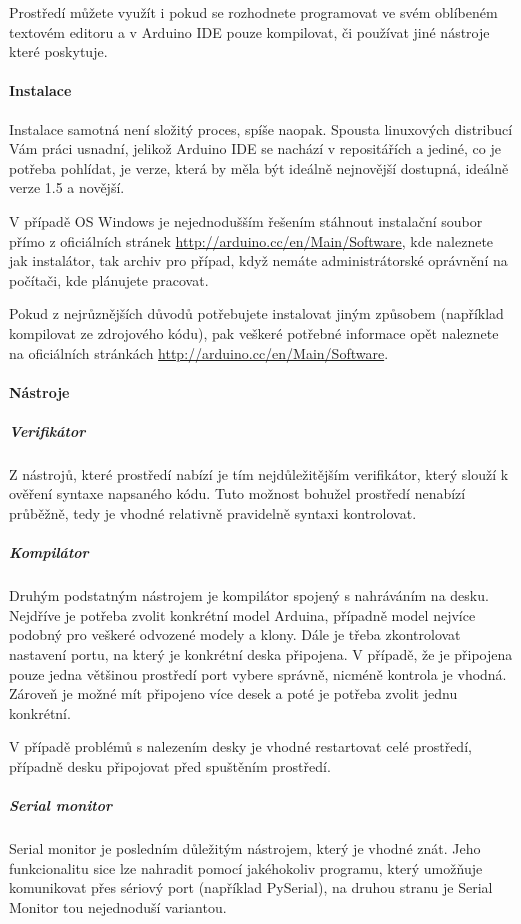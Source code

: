 \documentclass[12pt,titlepage]{article}
\begin{document}
	Prostředí můžete využít i pokud se rozhodnete programovat ve svém oblíbeném textovém editoru a v Arduino IDE pouze kompilovat, či používat jiné nástroje které poskytuje.
		\paragraph{Instalace}
			Instalace samotná není složitý proces, spíše naopak. Spousta linuxových distribucí Vám práci usnadní, jelikož Arduino IDE se nachází v repositářích a jediné, co je potřeba pohlídat, je verze, která by měla být ideálně nejnovější dostupná, ideálně verze 1.5 a novější. 
			
			V případě OS Windows je nejednodušším řešením stáhnout instalační soubor přímo z oficiálních stránek \url{http://arduino.cc/en/Main/Software}, kde naleznete jak instalátor, tak archiv pro případ, když nemáte administrátorské oprávnění na počítači, kde plánujete pracovat.
			
			Pokud z nejrůznějších důvodů potřebujete instalovat jiným způsobem (například kompilovat ze zdrojového kódu), pak veškeré potřebné informace opět naleznete na oficiálních stránkách \url{http://arduino.cc/en/Main/Software}.  
		\paragraph{Nástroje}
		
		\subparagraph{Verifikátor}
			Z nástrojů, které prostředí nabízí je tím nejdůležitějším verifikátor, který slouží k ověření syntaxe napsaného kódu. Tuto možnost bohužel prostředí nenabízí průběžně, tedy je vhodné relativně pravidelně syntaxi kontrolovat.
			
		\subparagraph{Kompilátor }
			Druhým podstatným nástrojem je kompilátor spojený s nahráváním na desku. Nejdříve je potřeba zvolit konkrétní model Arduina, případně model nejvíce podobný pro veškeré odvozené modely a klony.  Dále je třeba zkontrolovat nastavení portu, na který je konkrétní deska připojena. V případě, že je připojena pouze jedna většinou prostředí port vybere správně, nicméně kontrola je vhodná. Zároveň je možné mít připojeno více desek a poté je potřeba zvolit jednu konkrétní.
		
			V případě problémů s nalezením desky je vhodné restartovat celé prostředí, případně desku připojovat před spuštěním prostředí.
			
		\subparagraph{Serial monitor}
			Serial monitor je posledním důležitým nástrojem, který je vhodné znát. Jeho funkcionalitu sice lze nahradit pomocí jakéhokoliv programu, který umožňuje komunikovat přes sériový port (například PySerial), na druhou stranu je Serial Monitor tou nejednoduší variantou. 
			
\end{document}
